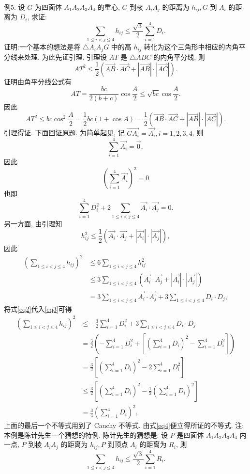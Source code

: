 例5. 设 $G$ 为四面体 $A_1 A_2 A_3 A_4$ 的重心, $G$ 到棱 $A_i A_j$ 的距离为 $h_{i j}, G$ 到 $A_i$ 的距离为 $D_i$, 求证:
$$
\sum_{1 \leqslant i<j \leqslant 4} h_{i j} \leqslant \frac{\sqrt{3}}{2} \sum_{i=1}^4 D_i . \label{eq1}
$$
证明:一个基本的想法是将 $\triangle A_i A_j G$ 中的高 $h_{i j}$ 转化为这个三角形中相应的内角平分线来处理.
为此先证引理.
引理设 $A T$ 是 $\triangle A B C$ 的内角平分线, 则
$$
A T^2 \leqslant \frac{1}{2}(\overrightarrow{A B} \cdot \overrightarrow{A C}+|\overrightarrow{A B}| \cdot|\overrightarrow{A C}|) .
$$
证明由角平分线公式有
$$
A T=\frac{b c}{2(b+c)} \cos \frac{A}{2} \leqslant \sqrt{b c} \cos \frac{A}{2} .
$$
因此
$$
A T^2 \leqslant b c \cos ^2 \frac{A}{2}=\frac{1}{2} b c(1+\cos A)=\frac{1}{2}(\overrightarrow{A B} \cdot \overrightarrow{A C}+|\overrightarrow{A B}| \cdot|\overrightarrow{A C}|) .
$$
引理得证.
下面回证原题.
为简单起见, 记 $\overrightarrow{G A_i}=\overrightarrow{A_i}, i=1,2,3,4$, 则
$$
\sum_{i=1}^4 \overrightarrow{A_i}=\overrightarrow{0},
$$
因此
$$
\left(\sum_{i=1}^4 \overrightarrow{A_i}\right)^2=0
$$
也即
$$
\sum_{i=1}^4 D_i^2+2 \sum_{1 \leqslant i<j \leqslant 4} \overrightarrow{A_i} \cdot \overrightarrow{A_j}=0 . \label{eq2}
$$
另一方面, 由引理知
$$
h_{i j}^2 \leqslant \frac{1}{2}\left(\overrightarrow{A_i} \cdot \overrightarrow{A_j}+\left|\overrightarrow{A_i}\right| \cdot\left|\overrightarrow{A_j}\right|\right),
$$
因此
$$
\begin{aligned}
\left(\sum_{1 \leqslant i<j \leqslant 4} h_{i j}\right)^2 & \leqslant 6 \sum_{1 \leqslant i<j \leqslant 4} h_{i j}^2 \\
& \leqslant 3 \sum_{1 \leqslant i<j \leqslant 4}\left(\overrightarrow{A_i} \cdot \overrightarrow{A_j}+\left|\overrightarrow{A_i}\right| \cdot\left|\overrightarrow{A_j}\right|\right) \\
& =3 \sum_{1 \leqslant i<j \leqslant 4} \overrightarrow{A_i} \cdot \overrightarrow{A_j}+3 \sum_{1 \leqslant i<j \leqslant 4} D_i \cdot D_j,
\end{aligned} \label{eq3}
$$
将式\ref{eq2}代入\ref{eq3}可得
$$
\begin{aligned}
\left(\sum_{1 \leqslant i<j \leqslant 4} h_{i j}\right)^2 & \leqslant-\frac{3}{2} \sum_{i=1}^4 D_i^2+3 \sum_{1 \leqslant i<j \leqslant 4} D_i \cdot D_j \\
& =\frac{3}{2}\left(-\sum_{i=1}^4 D_i^2+\left[\left(\sum_{i=1}^4 D_i\right)^2-\sum_{i=1}^4 D_i^2\right]\right) \\
& =\frac{3}{2}\left[\left(\sum_{i=1}^4 D_i\right)^2-2 \sum_{i=1}^4 D_i^2\right] \\
& \leqslant \frac{3}{2}\left[\left(\sum_{i=1}^4 D_i\right)^2-\frac{1}{2}\left(\sum_{i=1}^4 D_i\right)^2\right] \\
& =\frac{3}{4}\left(\sum_{i=1}^4 D_i\right)^2,
\end{aligned} \label{eq4}
$$
上面的最后一个不等式用到了 Cauchy 不等式.
由式\ref{eq4}便立得所证的不等式.
注:本例是陈计先生一个猜想的特例.
陈计先生的猜想是: 设 $P$ 是四面体 $A_1 A_2 A_3 A_4$ 内一点, $P$ 到棱 $A_i A_j$ 的距离为 $h_{i j}, P$ 到顶点 $A_i$ 的距离为 $R_i$, 则
$$
\sum_{1 \leqslant i<j \leqslant 4} h_{i j} \leqslant \frac{\sqrt{3}}{2} \sum_{i=1}^4 R_i .
$$


